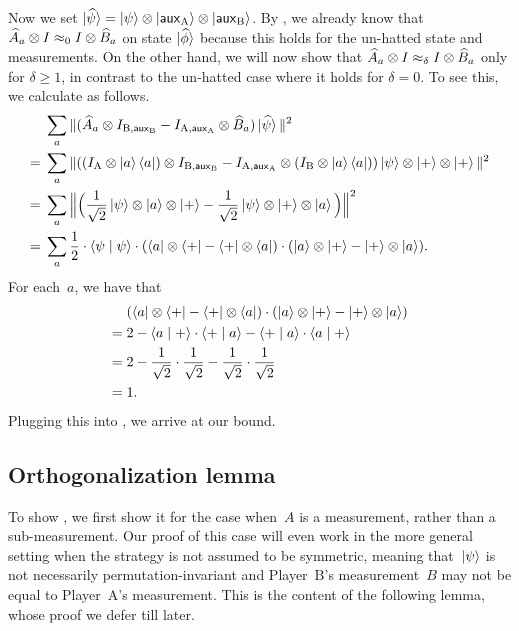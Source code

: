 \begin{example}
Now we set $\ket{\widehat{\psi}} = \ket{\psi}\otimes \ket{\mathsf{aux}_{\mathrm{A}}} \otimes \ket{\mathsf{aux}_{\mathrm{B}}}$.
By ,
we already know that $\widehat{A}_a \otimes I \approx_0 I \otimes \widehat{B}_a$
on state $\ket{\widehat{\phi}}$ because this holds for the un-hatted state and measurements.
On the other hand,
we will now show that $\widehat{A}_a \otimes I \approx_{\delta} I \otimes \widehat{B}_a$
only for $\delta \geq 1$, in contrast to the un-hatted case where it holds for $\delta = 0$.
To see this, we calculate as follows.
\begin{align}
&\sum_a \Vert (\widehat{A}_a \otimes I_{\mathrm{B}, \mathsf{aux}_{\mathrm{B}}}
	- I_{\mathrm{A}, \mathsf{aux}_{\mathrm{A}}} \otimes \widehat{B}_a) \ket{\widehat{\psi}}\Vert^2\nonumber\\
 ={}& \sum_a \Vert ((I_{\mathrm{A}} \otimes \ket{a}\bra{a}) \otimes I_{\mathrm{B}, \mathsf{aux}_{\mathrm{B}}}
	- I_{\mathrm{A}, \mathsf{aux}_{\mathrm{A}}} \otimes (I_{\mathrm{B}} \otimes \ket{a}\bra{a}))
		\ket{\psi} \otimes \ket{+} \otimes \ket{+}\Vert^2\nonumber\\
={}& \sum_a \Big\Vert \Big(\frac{1}{\sqrt{2}} \ket{\psi} \otimes \ket{a}\otimes\ket{+}
			- \frac{1}{\sqrt{2}} \ket{\psi} \otimes \ket{+} \otimes \ket{a}\Big) \Big\Vert^2\nonumber\\
={}& \sum_a \frac{1}{2} \cdot \braket{\psi \mid \psi} 
	\cdot (\bra{a} \otimes \bra{+}- \bra{+} \otimes \bra{a}) \cdot (\ket{a} \otimes \ket{+}- \ket{+} \otimes \ket{a}).\label{eq:awefea}
\end{align}
For each~$a$, we have that
\begin{align*}
&(\bra{a} \otimes \bra{+}- \bra{+} \otimes \bra{a}) \cdot (\ket{a} \otimes \ket{+}- \ket{+} \otimes \ket{a})\\
={}& 2 - \braket{a \mid +} \cdot \braket{+ \mid a} - \braket{+ \mid a} \cdot \braket{a \mid +}\\
={}& 2 - \frac{1}{\sqrt{2}}\cdot \frac{1}{\sqrt{2}} - \frac{1}{\sqrt{2}} \cdot \frac{1}{\sqrt{2}}\\
={}& 1.
\end{align*}
Plugging this into , we arrive at our bound.
\end{example}

\subsection{Orthogonalization lemma}\label{sec:orthogonalization}

To show ,
we first show it for the case when~$A$ is a measurement, rather than a sub-measurement.
Our proof of this case will even work in the more general setting
when the strategy is not assumed to be symmetric,
meaning that~$\ket{\psi}$ is not necessarily permutation-invariant and Player~$\mathrm{B}$'s measurement~$B$ may not be equal to Player~$\mathrm{A}$'s measurement.
This is the content of the following lemma, whose proof we defer till later. 

